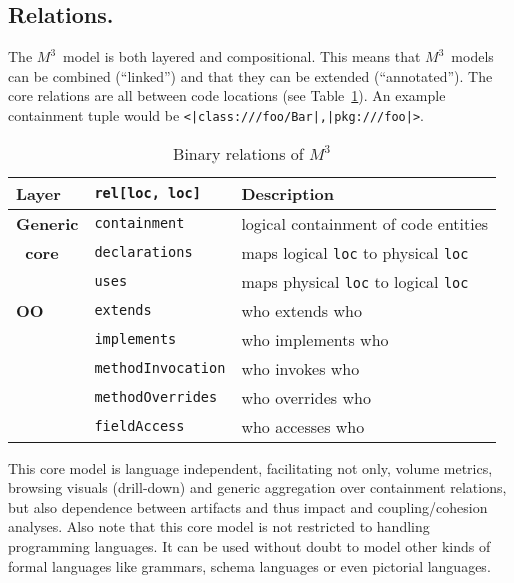 \documentclass[conference]{IEEEtran}
\newcommand{\loc}[1]{\small{\texttt{#1}}\xspace}
\newcommand{\mthree}{\ensuremath{M^3}\xspace}
\begin{document}
\subsection{Relations.} The \mthree\  model is both layered and compositional.
This means that \mthree\ models can be combined (``linked'') and that they can
be extended (``annotated''). The core relations are all between code
locations (see Table~\ref{table:core}). An example containment
tuple would be \loc{<|class:///foo/Bar|,|pkg:///foo|>}.

\begin{table}[t]
\begin{tabularx}{\columnwidth}{|l|l|X|}\hline
 Layer & \lstinline{rel[loc, loc]} & Description \\\hline 
\textbf{Generic} & \lstinline{containment} & logical containment of 
code entities \\
\textbf{~core} & \lstinline{declarations} & maps logical \lstinline{loc} to physical \lstinline{loc} \\
& \lstinline{uses} & maps physical \lstinline{loc} to logical \lstinline{loc} \\\hline
 \textbf{OO} & \lstinline{extends} & who extends who \\
 & \lstinline{implements} & who implements who \\
 & \lstinline{methodInvocation} & who invokes who \\
 & \lstinline{methodOverrides}  & who overrides who \\
& \lstinline{fieldAccess} & who accesses who \\\hline
\end{tabularx}
\caption{Binary relations of \mthree \label{table:core}}\vspace{-9mm}
\end{table}

This core model is language independent, facilitating not only, volume
metrics, browsing visuals (drill-down) and generic aggregation over
containment relations, but also dependence between artifacts and thus impact
and coupling/cohesion analyses. Also note that this core model is not
restricted to handling programming languages. It can be used without doubt to
model other kinds of formal languages like grammars, schema languages or even
pictorial languages.
\end{document}
